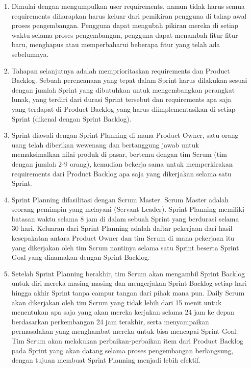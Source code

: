 \begin{enumerate}
\item Dimulai dengan mengumpulkan user requirements, namun tidak harus semua requirements diharapkan harus keluar dari pemikiran pengguna di tahap awal proses pengembangan. Pengguna dapat mengubah pikiran mereka di setiap waktu selama proses pengembangan, pengguna dapat menambah fitur-fitur baru, menghapus atau memperbaharui beberapa fitur yang telah ada sebelumnya.

\item Tahapan selanjutnya adalah memprioritaskan requirements dan Product Backlog. Sebuah perencanaan yang tepat dalam Sprint harus dilakukan sesuai dengan jumlah Sprint yang dibutuhkan untuk mengembangkan perangkat lunak, yang terdiri dari durasi Sprint tersebut dan requirements apa saja yang terdapat di Product Backlog yang harus diimplementasikan di setiap Sprint (dikenal dengan Sprint Backlog).

\item Sprint diawali dengan Sprint Planning di mana Product Owner, satu orang uang telah diberikan wewenang dan bertanggung jawab untuk memaksimalkan nilai produk di pasar, bertemu dengan tim Scrum (tim dengan jumlah 2-9 orang), kemudian bekerja sama untuk memperkirakan requirements dari Product Backlog apa saja yang dikerjakan selama satu Sprint.

\item Sprint Planning difasilitasi dengan Scrum Master. Scrum Master adalah seorang pemimpin yang melayani (Servant Leader). Sprint Planning memiliki batasan waktu selama 8 jam di dalam sebuah Sprint yang berdurasi selama 30 hari. Keluaran dari Sprint Planning adalah daftar pekerjaan dari hasil kesepakatan antara Product Owner dan tim Scrum di mana pekerjaan itu yang dikerjakan oleh tim Scrum nantinya selama satu Sprint beserta Sprint Goal yang dinamakan dengan Sprint Backlog.

\item Setelah Sprint Planning berakhir, tim Scrum akan mengambil Sprint Backlog untuk diri mereka masing-masing dan mengerjakan Sprint Backlog setiap hari hingga akhir Sprint tanpa campur tangan dari pihak mana pun. Daily Scrum akan dikerjakan oleh tim Scrum yang tidak lebih dari 15 menit untuk menentukan apa saja yang akan mereka kerjakan selama 24 jam ke depan berdasarkan perkembangan 24 jam terakhir, serta menyampaikan permasalahan yang menghambat mereka untuk bisa mencapai Sprint Goal. Tim Scrum akan melakukan perbaikan-perbaikan item dari Product Backlog pada Sprint yang akan datang selama proses pengembangan berlangsung, dengan tujuan membuat Sprint Planning menjadi lebih efektif.


\end{enumerate}
